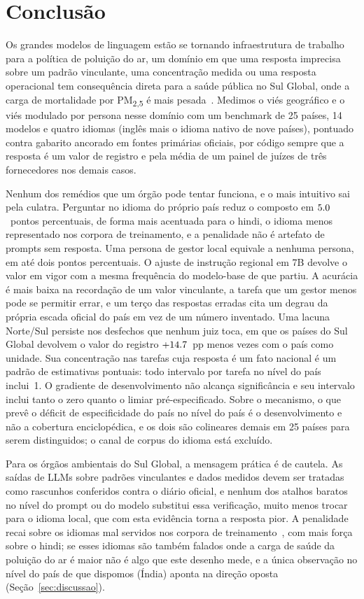\section{Conclusão}
\label{sec:conclusao}

Os grandes modelos de linguagem estão se tornando infraestrutura de trabalho
para a política de poluição do ar, um domínio em que uma resposta imprecisa
sobre um padrão vinculante, uma concentração medida ou uma resposta
operacional tem consequência direta para a saúde pública no Sul Global, onde a
carga de mortalidade por PM\textsubscript{2,5} é mais
pesada~\citep{gbd2019risk,requia2024shortterm}. Medimos o viés geográfico e o
viés modulado por persona nesse domínio com um benchmark de 25 países, 14
modelos e quatro idiomas (inglês mais o idioma nativo de nove países),
pontuado contra gabarito ancorado em fontes primárias oficiais, por código
sempre que a resposta é um valor de registro e pela média de um painel de
juízes de três fornecedores nos demais casos.

Nenhum dos remédios que um órgão pode tentar funciona, e o mais intuitivo sai
pela culatra. Perguntar no idioma do próprio país reduz o composto em
$5.0$~pontos percentuais, de forma mais acentuada para o hindi, o idioma
menos representado nos corpora de treinamento, e a penalidade não é artefato de
prompts sem resposta. Uma persona de gestor local equivale a nenhuma persona,
em até dois pontos percentuais. O ajuste de instrução regional em 7B devolve o
valor em vigor com a mesma frequência do modelo-base de que partiu. A acurácia é
mais baixa na recordação de um valor vinculante, a tarefa que um gestor menos
pode se permitir errar, e um terço das respostas erradas cita um degrau da
própria escada oficial do país em vez de um número inventado. Uma lacuna
Norte/Sul persiste nos desfechos que nenhum juiz toca, em que os países do Sul
Global devolvem o valor do registro $+14.7$~pp menos vezes com o país como
unidade. Sua concentração nas tarefas cuja resposta é um fato nacional é um
padrão de estimativas pontuais: todo intervalo por tarefa no nível do país
inclui~1. O gradiente de desenvolvimento não alcança significância e seu
intervalo inclui tanto o zero quanto o limiar pré-especificado. Sobre o
mecanismo, o que prevê o déficit de especificidade do país no nível do país é o
desenvolvimento e não a cobertura enciclopédica, e os dois são colineares demais
em 25 países para serem distinguidos; o canal de corpus do idioma está
excluído.

Para os órgãos ambientais do Sul Global, a mensagem prática é de cautela. As
saídas de LLMs sobre padrões vinculantes e dados medidos devem ser tratadas
como rascunhos conferidos contra o diário oficial, e nenhum dos atalhos baratos
no nível do prompt ou do modelo substitui essa verificação, muito menos trocar
para o idioma local, que com esta evidência torna a resposta pior. A penalidade
recai sobre os idiomas mal servidos nos corpora de
treinamento~\citep{joshi2020state}, com mais força sobre o hindi; se esses
idiomas são também falados onde a carga de saúde da poluição do ar é maior não
é algo que este desenho mede, e a única observação no nível do país de que
dispomos (Índia) aponta na direção oposta (Seção~\ref{sec:discussao}).

